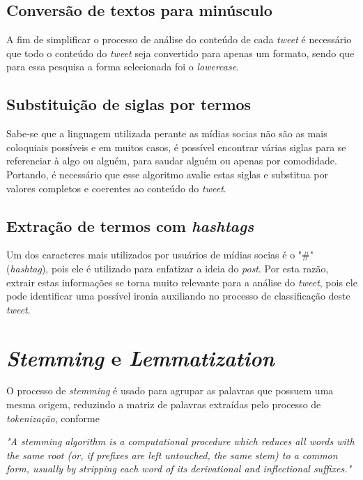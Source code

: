 \subsection{Conversão de textos para minúsculo}

A fim de simplificar o processo de análise do conteúdo de cada \textit{tweet} é necessário que todo o conteúdo do \textit{tweet} seja convertido para apenas um formato, sendo que para essa pesquisa a forma selecionada foi o \textit{lowercase}.

\subsection{Substituição de siglas por termos}

Sabe-se que a linguagem utilizada perante as mídias socias não são as mais coloquiais possíveis e em muitos casos, é possível encontrar várias siglas para se referenciar à algo ou alguém, para saudar alguém ou apenas por comodidade. Portando, é necessário que esse algoritmo avalie estas siglas e substitua por valores completos e coerentes ao conteúdo do \textit{tweet}.

\subsection{Extração de termos com \textit{hashtags}}

Um dos caracteres mais utilizados por usuários de mídias socias é o "\#" (\textit{hashtag}), pois ele é utilizado para enfatizar a ideia do \textit{post}. Por esta razão, extrair estas informações se torna muito relevante para a análise do \textit{tweet}, pois ele pode identificar uma possível ironia auxiliando no processo de classificação deste \textit{tweet}.

\section{\textit{Stemming} e \textit{Lemmatization}}

O processo de \textit{stemming} é usado para agrupar as palavras que possuem uma mesma origem, reduzindo a matriz de palavras extraídas pelo processo de \textit{tokenização}, conforme \cite[p.24]{development_of_stemming_algorithm}

\begin{citacao}
	\textit{"A stemming algorithm is a computational procedure which reduces all words with the same root (or, if prefixes are left untouched, the same stem) to a common form, usually by stripping each word of its derivational and inflectional suffixes."}
\end{citacao}

